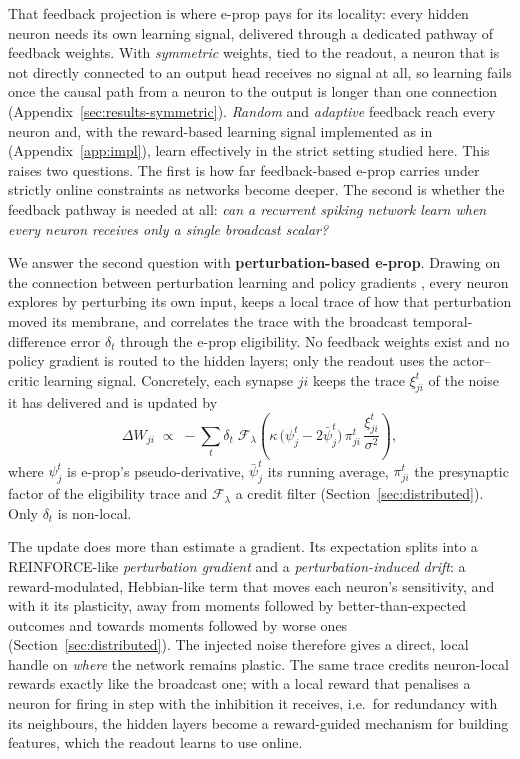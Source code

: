 \documentclass[10pt,twocolumn]{article}
\newcommand{\method}{perturbation-based e-prop}   %
\begin{document}
That feedback projection is where e-prop pays for its locality: every hidden neuron
needs its own learning signal, delivered through a dedicated pathway of feedback
weights. With \emph{symmetric} weights, tied to the readout, a neuron that is not
directly connected to an output head receives no signal at all, so learning fails
once the causal path from a neuron to the output is longer than one connection
(Appendix~\ref{sec:results-symmetric}). \emph{Random} and \emph{adaptive} feedback
reach every neuron and, with the reward-based learning signal implemented as in
\citet{eprop2020} (Appendix~\ref{app:impl}), learn effectively in the strict setting
studied here. This raises two questions. The first is how far feedback-based e-prop
carries under strictly online constraints as networks become deeper.
The second is whether the feedback pathway is needed at all: \emph{can a recurrent
spiking network learn when every neuron receives only a single broadcast scalar?}

We answer the second question with \textbf{\method{}}. Drawing on the connection
between perturbation learning and policy gradients
\citep{fiete2006gradient,salimans2017evolutionstrategiesscalablealternative}, every
neuron explores by perturbing its own input, keeps a local trace of how that
perturbation moved its membrane, and correlates the trace with the broadcast
temporal-difference error $\delta_t$ through the e-prop eligibility. No feedback
weights exist and no policy gradient is routed to the hidden layers; only the readout
uses the actor--critic learning signal. Concretely, each synapse $ji$ keeps the trace
$\xi^t_{ji}$ of the noise it has delivered and is updated by
\begin{equation}
\Delta W_{ji}\;\propto\;-\sum_t \delta_t\;\mathcal{F}_{\lambda}\!\left(
\kappa\,\big(\psi^t_j-2\bar\psi^t_j\big)\,\pi^t_{ji}\,\frac{\xi^t_{ji}}{\sigma^2}\right),
\label{eq:intro-update}
\end{equation}
where $\psi^t_j$ is e-prop's pseudo-derivative, $\bar\psi^t_j$ its running average,
$\pi^t_{ji}$ the presynaptic factor of the eligibility trace and $\mathcal{F}_\lambda$
a credit filter (Section~\ref{sec:distributed}). Only $\delta_t$ is non-local.

The update does more than estimate a gradient. Its expectation splits into a
REINFORCE-like \emph{perturbation gradient} and a \emph{perturbation-induced drift}: a
reward-modulated, Hebbian-like term that moves each neuron's sensitivity, and with it
its plasticity, away from moments followed by better-than-expected outcomes and
towards moments followed by worse ones (Section~\ref{sec:distributed}). The injected
noise therefore gives a direct, local handle on \emph{where} the network remains
plastic. The same trace credits neuron-local rewards exactly like the broadcast one;
with a local reward that penalises a neuron for firing in step with the inhibition it
receives, i.e.\ for redundancy with its neighbours, the hidden layers become a
reward-guided mechanism for building features, which the readout learns to use online.
\end{document}
